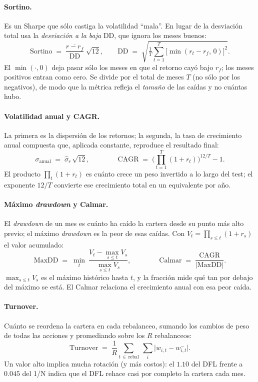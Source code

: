 \documentclass[11pt]{article}
\begin{document}
\paragraph{Sortino.} Es un Sharpe que sólo castiga la volatilidad ``mala''. En lugar de la desviación
total usa la \emph{desviación a la baja} $\mathrm{DD}$, que ignora los meses buenos:
\[
\text{Sortino} \;=\; \frac{\overline{r-r_f}}{\mathrm{DD}}\;\sqrt{12},
\qquad
\mathrm{DD} \;=\; \sqrt{\tfrac{1}{T}\sum_{t=1}^{T}\big[\min(r_t-r_f,\,0)\big]^2}.
\]
El $\min(\cdot,0)$ deja pasar sólo los meses en que el retorno cayó bajo $r_f$; los meses positivos
entran como cero. Se divide por el total de meses $T$ (no sólo por los negativos), de modo que la
métrica refleja el \emph{tamaño} de las caídas y no cuántas hubo.
 
\paragraph{Volatilidad anual y CAGR.} La primera es la dispersión de los retornos; la segunda, la
tasa de crecimiento anual compuesta que, aplicada constante, reproduce el resultado final:
\[
\sigma_{\text{anual}} \;=\; \hat{\sigma}_r\,\sqrt{12},
\qquad\qquad
\text{CAGR} \;=\; \Big(\prod_{t=1}^{T}(1+r_t)\Big)^{12/T}-1.
\]
El producto $\prod_t (1+r_t)$ es cuánto crece un peso invertido a lo largo del test; el exponente
$12/T$ convierte ese crecimiento total en un equivalente por año.
 
\paragraph{Máximo \emph{drawdown} y Calmar.} El \emph{drawdown} de un mes es cuánto ha caído la
cartera desde su punto más alto previo; el máximo \emph{drawdown} es la peor de esas caídas. Con
$V_t=\prod_{s\le t}(1+r_s)$ el valor acumulado:
\[
\text{MaxDD} \;=\; \min_{t}\ \frac{V_t-\max_{s\le t}V_s}{\max_{s\le t}V_s},
\qquad\qquad
\text{Calmar} \;=\; \frac{\text{CAGR}}{|\text{MaxDD}|}.
\]
$\max_{s\le t}V_s$ es el máximo histórico hasta $t$, y la fracción mide qué tan por
debajo del máximo se está. El Calmar relaciona el crecimiento anual con esa peor caída.
 
\paragraph{Turnover.} Cuánto se reordena la cartera en cada rebalanceo, sumando los cambios de peso
de todas las acciones y promediando sobre los $R$ rebalanceos:
\[
\text{Turnover} \;=\; \frac{1}{R}\sum_{t\,\in\,\text{rebal}}\ \sum_i \big|w_{i,t}-w_{i,t}^{-}\big|.
\]
Un valor alto implica mucha rotación (y más costos): el $1.10$ del DFL frente a $0.045$ del 1/N indica
que el DFL rehace casi por completo la cartera cada mes.
 
\end{document}
